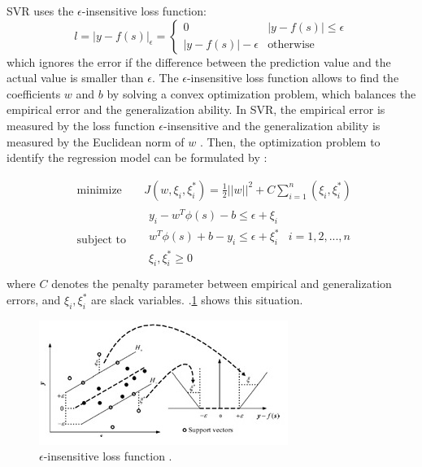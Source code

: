 \documentclass[review]{elsarticle}
\begin{document}
SVR uses the $\epsilon$-insensitive loss function:
\begin{equation*}
l= {\left| y - f(s) \right| }_{\epsilon } = 
\begin{cases}
   0 & {\left| y - f(s) \right| } \leq \epsilon \\
   \left| y - f(s) \right| - \epsilon & \text{otherwise}
\end{cases}
\end{equation*}
which ignores the error if the difference between the prediction value and the actual value is smaller than $\epsilon$.
%
The $\epsilon$-insensitive loss function allows to find the coefficients $w$ and $b$ by solving a convex optimization problem, which balances the empirical error and the generalization ability.
%
In SVR, the empirical error is measured by the loss function $\epsilon$-insensitive and the generalization ability is measured by the Euclidean norm of $w$ \citep{XXXX201X}.
%
Then, the optimization problem to identify the regression model can be
formulated by \citep{Wei2013}: 

\begin{equation} 
\begin{aligned}
& \underset{}{\text{minimize}}
& & J(w,\xi_i , \xi_i^* ) = \frac{1}{2}   \Bigr| \Bigr| w \Bigr| \Bigr|^2 + C \sum_{i=1}^{n} (\xi_i , \xi_i^* )    \\
& \text{subject to}
& & \begin{array}{lcl} 
y_i - w^T \phi (s) - b  \leq \epsilon + \xi_i   \\
w^T \phi (s) + b - y_i \leq \epsilon + \xi_i^* & i= 1,2,...,n \\
\xi_i , \xi_i^* \geq 0  \\
\end{array}
\end{aligned}
\end{equation}  
where $C$ denotes the penalty parameter between empirical and generalization errors, and  $\xi_i , \xi_i^*$ are slack variables. \figurename
$.$\ref{figura2} shows this situation.

\begin{figure}[h] 
 \centering
 \includegraphics[scale=.9]{SVR}
 \caption{$\epsilon$-insensitive loss function \citep{Wei2013}.} 
 \label{figura2} 
\end{figure}
 
\end{document}
